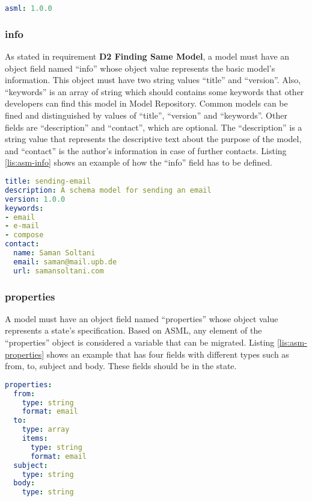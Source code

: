 \lstset{
  label=lis:asm-asml, caption=Application State Model “asml” field example., 
}
\begin{lstlisting}[language=yaml]
asml: 1.0.0
\end{lstlisting}
\subsubsection{info}
As stated in requirement \textbf{D2 Finding Same Model}, a model must have an object field named “info” whose object value represents the basic model’s information. This object must have two string values “title” and “version”. Also, “keywords” is an array of string which should contains some keywords that other developers can find this model in Model Repository. Common models can be fined and distinguished by values of “title”, “version” and “keywords”. Other fields are “description” and “contact”, which are optional. The “description” is a string value that represents the descriptive text about the purpose of the model, and “contact” is the author’s information in case of further contacts. Listing \ref{lis:asm-info} shows an example of how the “info” field has to be defined.

\lstset{
  label=lis:asm-info, caption=Application State Model “info” field example. 
}
\begin{lstlisting}[language=yaml]
title: sending-email
description: A schema model for sending an email
version: 1.0.0
keywords:
- email
- e-mail
- compose
contact:
  name: Saman Soltani
  email: saman@mail.upb.de
  url: samansoltani.com

\end{lstlisting}

\subsubsection{properties}
A model must have an object field named “properties” whose object value represents a state’s specification. Based on ASML, any element of the “properties” object is considered a variable that can be migrated.
Listing \ref{lis:asm-properties} shows an example that has four fields with different types such as from, to, subject and body. These fields should be in the state.

\lstset{
  label=lis:asm-properties, caption=Application State Model “properties” field example.
}
\begin{lstlisting}[language=yaml]
properties:
  from:
    type: string
    format: email
  to:
    type: array
    items:
      type: string
      format: email
  subject:
    type: string
  body:
    type: string

\end{lstlisting}
